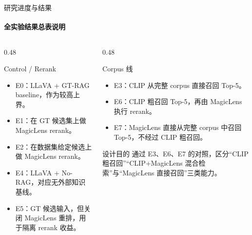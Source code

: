 \documentclass[10pt,aspectratio=169,]{beamer}
\begin{document}
\begin{frame}{研究进度与结果}
	\framesubtitle{全实验结果总表说明}
	\begin{columns}[T]
		\begin{column}{0.48\textwidth}
			\begin{block}{Control / Rerank}
				\begin{itemize}
					\item E0：LLaVA + GT-RAG baseline，作为较高上界。
					\item E1：在 GT 候选集上做 MagicLens rerank。
					\item E2：在数据集给定候选上做 MagicLens rerank。
					\item E4：LLaVA + No-RAG，对应无外部知识基线。
					\item E5：GT 候选输入，但关闭 MagicLens 重排，用于隔离 rerank 收益。
				\end{itemize}
			\end{block}
		\end{column}
		\begin{column}{0.48\textwidth}
			\begin{alertblock}{Corpus 线}
				\begin{itemize}
					\item E3：CLIP 从完整 corpus 直接召回 Top-5。
					\item E6：CLIP 粗召回 Top-5，再由 MagicLens 执行 rerank。
					\item E7：MagicLens 直接从完整 corpus 中召回 Top-5，不经过 CLIP 粗召回。
				\end{itemize}
			\end{alertblock}
			\begin{block}{设计目的}
				通过 E3、E6、E7 的对照，区分“CLIP 粗召回”“CLIP+MagicLens 混合检索”与“MagicLens 直接召回”三类能力。
			\end{block}
		\end{column}
	\end{columns}
\end{frame}
\end{document}

